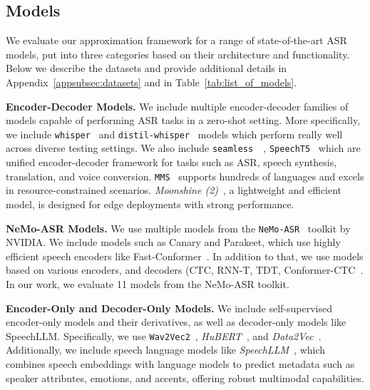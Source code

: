 \subsection{Models}\label{subsec:models}

We evaluate our approximation framework for a range of state-of-the-art ASR models, put into three categories based on their architecture and functionality. Below we describe the datasets and provide additional details in Appendix~\ref{appsubsec:datasets} and in Table~\ref{tab:list_of_models}.

\noindent\textbf{Encoder-Decoder Models.}  
We include multiple encoder-decoder families of models capable of performing ASR tasks in a zero-shot setting. More specifically, we include \texttt{whisper}~\cite{radford2023robust} and \texttt{distil-whisper}~\cite{gandhi2023distilwhisper} models which perform really well across diverse testing settings. We also include \texttt{seamless }~\cite{communication2023seamlessm4tmassivelymultilingual, seamless2023, Barrault2025}, \texttt{SpeechT5}~\cite{ao2022speecht5unifiedmodalencoderdecoderpretraining} which are unified encoder-decoder framework for tasks such as ASR, speech synthesis, translation, and voice conversion. \texttt{MMS}~\cite{pratap2023scalingspeechtechnology1000} supports hundreds of languages and excels in resource-constrained scenarios. \textit{Moonshine (2)}~\cite{jeffries2024moonshinespeechrecognitionlive}, a lightweight and efficient model, is designed for edge deployments with strong performance.


\noindent\textbf{NeMo-ASR Models.}  
We use multiple models from the \texttt{NeMo-ASR}~\cite{gulati2020conformerconvolutionaugmentedtransformerspeech, variani2020hybridautoregressivetransducerhat, noroozi2024statefulconformercachebasedinference, tang2023hybridtransducerattentionbased, Harper_NeMo_a_toolkit} toolkit by NVIDIA. We include models such as Canary and Parakeet, which use highly efficient speech encoders like Fast-Conformer~\cite{rekesh2023fastconformerlinearlyscalable}. In addition to that, we use models based on various encoders, and decoders (CTC, RNN-T, TDT, Conformer-CTC~\cite{guo2021multispeakerasrcombiningnonautoregressive}. In our work, we evaluate 11 models from the NeMo-ASR toolkit.




\noindent\textbf{Encoder-Only and Decoder-Only Models.}  
We include self-supervised encoder-only models and their derivatives, as well as decoder-only models like SpeechLLM. Specifically, we use \texttt{Wav2Vec2}~\cite{schneider2019wav2vecunsupervisedpretrainingspeech, baevski2020wav2vec20frameworkselfsupervised}, \textit{HuBERT}~\cite{hsu2021hubertselfsupervisedspeechrepresentation}, and \textit{Data2Vec}~\cite{baevski2022data2vecgeneralframeworkselfsupervised}. Additionally, we include speech language models like \textit{SpeechLLM}~\cite{Rajaa_SpeechLLM_Multi-Modal_LLM}, which combines speech embeddings with language models to predict metadata such as speaker attributes, emotions, and accents, offering robust multimodal capabilities.




